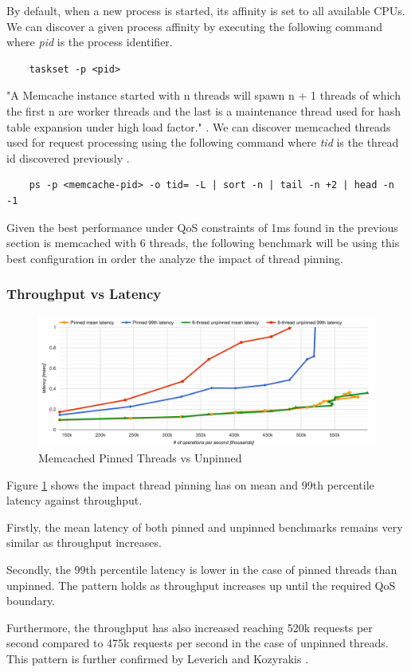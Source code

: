 By default, when a new process is started, its affinity is set to all available CPUs. We can discover a given process affinity by executing the following command where \textit{pid} is the process identifier.

\begin{lstlisting}
    taskset -p <pid>
\end{lstlisting}


"A Memcache instance started with n threads will spawn n + 1 threads of which the first n are worker threads and the last is a maintenance thread used for hash table expansion under high load factor." \cite{solarflarememcached}. We can discover memcached threads used for request processing using the following command where \textit{tid} is the thread id discovered previously \cite{solarflarememcached}.
\begin{lstlisting}
    ps -p <memcache-pid> -o tid= -L | sort -n | tail -n +2 | head -n -1
\end{lstlisting}

Given the best performance under QoS constraints of 1ms found in the previous section is memcached with 6 threads, the following benchmark will be using this best configuration in order the analyze the impact of thread pinning.

\subsubsection{Throughput vs Latency}

\begin{figure}[h]
    \includegraphics[width=\textwidth]{./res/5_threads_pinned.png}
    \caption{Memcached Pinned Threads vs Unpinned}
    \label{fig:memcached-threads-pinned}
\end{figure}

Figure \ref{fig:memcached-threads-pinned} shows the impact thread pinning has on mean and 99th percentile latency against throughput.

Firstly, the mean latency of both pinned and unpinned benchmarks remains very similar as throughput increases.

Secondly, the 99th percentile latency is lower in the case of pinned threads than unpinned. The pattern holds as throughput increases up until the required QoS boundary.

Furthermore, the throughput has also increased reaching 520k requests per second compared to 475k requests per second in the case of unpinned threads. This pattern is further confirmed by  Leverich and Kozyrakis \cite{leverich2014reconciling}.
